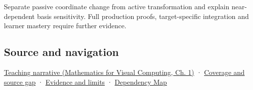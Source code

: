 Separate passive coordinate change from active transformation and explain near-dependent basis sensitivity. Full production proofs, target-specific integration and learner mastery require further evidence.

\subsection{Source and navigation}\label{appendix-ce0341f7ea0d-source-and-navigation}

\hypertarget{appendix-ce0341f7ea0d-source-and-navigation}{}

\href{../02-Mathematics-for-Visual-Computing/main.pdf\#nameddest=01-foundations-i-ch017-a-basis-is-a-measuring-arrangement-not-the-vector-itself}{Teaching narrative (Mathematics for Visual Computing, Ch. 1)} · \hyperref[appendix-fd090d982a15-phase-6---parts-501-600]{Coverage and source gap} · \hyperref[appendix-a103e7846d21-phase-6---source-analysis-and-verification]{Evidence and limits} · \hyperref[appendix-4ad47bdd269a]{Dependency Map}
